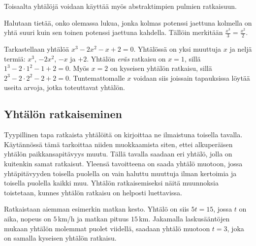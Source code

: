 Toisaalta yhtälöjä voidaan käyttää myös abstraktimpien pulmien ratkaisuun.

\begin{esimerkki}
	Halutaan tietää, onko olemassa lukua, jonka kolmas potenssi jaettuna kolmella on yhtä suuri kuin sen toinen potenssi jaettuna kahdella. Tällöin merkitään $\frac{x^3}{3}=\frac{x^2}{2}$. 
\end{esimerkki}


\begin{esimerkki}
Tarkastellaan yhtälöä $x^3-2x^2-x+2=0$.  Yhtälössä on yksi muuttuja $x$ ja neljä termiä: $x^3$, $-2x^2$, $-x$ ja $+2$. Yhtälön \textit{eräs} ratkaisu on $x=1$, sillä $1^3-2\cdot{1^2}-1+2=0$. Myös $x=2$ on kyseisen yhtälön ratkaisu, sillä $2^3-2\cdot{2^2}-2+2=0$. Tuntemattomalle $x$ voidaan siis joissain tapauksissa löytää useita arvoja, jotka toteuttavat yhtälön. 
\end{esimerkki}

\subsection*{Yhtälön ratkaiseminen}

Tyypillinen tapa ratkaista yhtälöitä on kirjoittaa ne ilmaistuna toisella tavalla. Käytännössä tämä tarkoittaa niiden muokkaamista siten, ettei alkuperäisen yhtälön paikkansapitävyys muutu. Tällä tavalla saadaan eri yhtälö, jolla on kuitenkin samat ratkaisut. Yleensä tavoitteena on saada yhtälö muotoon, jossa yhtäpitävyyden toisella puolella on vain haluttu muuttuja ilman kertoimia ja toisella puolella kaikki muu.  Yhtälön ratkaisemiseksi näitä muunnoksia toistetaan, kunnes yhtälön ratkaisu on helposti luettavissa.

\begin{esimerkki}
Ratkaistaan aiemman esimerkin matkan kesto. Yhtälö on siis $5t=15$, jossa $t$ on aika, nopeus on $5$\,km/h ja matkan pituus $15$\,km. Jakamalla laskusääntöjen mukaan yhtälön molemmat puolet viidellä, saadaan yhtälö muotoon $t=3$, joka on samalla kyseisen yhtälön ratkaisu.
\end{esimerkki}

